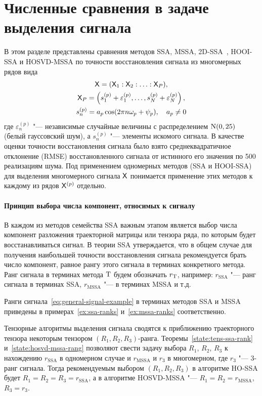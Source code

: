 \documentclass[specialist,
  substylefile=spbu.rtx,
subf,href,colorlinks=true, 12pt]{disser}
\theoremstyle{plain}
\theoremstyle{definition}
\theoremstyle{remark}
\begin{document}
\section{Численные сравнения в задаче выделения сигнала}\label{sec:numerical-compar}
В этом разделе представлены сравнения методов SSA, MSSA, 2D-SSA~\cite{2d-ssa}, HOOI-SSA и HOSVD-MSSA
по точности восстановления сигнала из многомерных рядов вида
\begin{gather}
  \mathsf{X} = (\mathsf{X}_1: \mathsf{X}_2 : \ldots: \mathsf{X}_P), \nonumber \\
  \mathsf{X}_P = \left(s_1^{(p)} + \varepsilon_1^{(p)}, \ldots, s_N^{(p)} + \varepsilon_N^{(p)}\right),\nonumber \\
  s_n^{(p)} = a_p \cos(2\pi n \omega_p + \psi_p), \quad a_p \ne 0 \label{eq:general-signal-example}
\end{gather}
где $\varepsilon_n^{(p)}$ "--- независимые случайные величины с распределением $\mathrm{N}(0, 25)$
(белый гауссовский шум), а $s_n^{(p)}$ "--- элементы искомого сигнала.
В качестве оценки точности восстановления сигнала было взято среднеквадратичное отклонение (RMSE)
восстановленного сигнала от истинного его значения по 500 реализациям шума.
Под применением одномерных методов (SSA и HOOI-SSA) для выделения многомерного сигнала $\mathsf{X}$ понимается
применение этих методов к каждому из рядов $\mathsf{X}^{(p)}$ отдельно.

\paragraph{Принцип выбора числа компонент, относимых к сигналу}\label{subsec:example-signal-ranks}
В каждом из методов семейства SSA важным этапом является выбор числа компонент разложения траекторной матрицы
или тензора ряда, по которым будет восстанавливаться сигнал.
В теории SSA утверждается, что в общем случае для получения наибольшей точности восстановления
сигнала рекомендуется брать число компонент, равное рангу этого сигнала в терминах конкретного метода.
Ранг сигнала в терминах метода $\mathrm{T}$ будем обозначать $r_{\mathrm{T}}$, например: $r_\text{SSA}$ "---
ранг сигнала в терминах SSA, $r_\text{MSSA}$ "--- в терминах MSSA и т.д.

Ранги сигнала~\eqref{eq:general-signal-example} в терминах методов SSA и MSSA приведены в
примерах~\ref{ex:ssa-ranks} и~\ref{ex:mssa-ranks} соответственно.

Тензорные алгоритмы выделения сигнала сводятся к приближению траекторного тензора некоторым
тензором $(R_1, R_2, R_3)$-ранга.
Теоремы~\ref{state:tens-ssa-rank} и~\ref{state:hosvd-mssa-rang} позволяют свести задачу выбора $R_1$,
$R_2$, $R_3$ к нахождению $r_{\text{SSA}}$ в одномерном случае и $r_\text{MSSA}$ и $r_3$ в многомерном,
где $r_3$ "--- 3-ранг сигнала.
Тогда рекомендуемым выбором $(R_1, R_2, R_3)$ в алгоритме HO-SSA будет $R_1=R_2=R_3=r_\text{SSA}$, а
в алгоритме HOSVD-MSSA "--- $R_1=R_2=r_\text{MSSA}$, $R_3 = r_3$.
\end{document}
